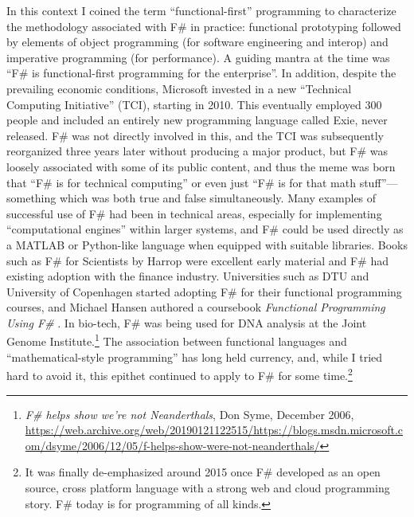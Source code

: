 \documentclass[acmsmall]{acmart}\settopmatter{}
\begin{document}
In this context I coined the term “functional-first” programming to characterize the methodology associated with F\# in practice: functional prototyping
followed by elements of object programming (for software engineering and interop) and imperative programming (for performance). A guiding mantra
at the time was “F\# is functional-first programming for the enterprise”.  In addition, despite the prevailing economic conditions, Microsoft invested in a
new “Technical Computing Initiative” (TCI), starting in 2010. This eventually employed 300 people and included an entirely new programming language
called Exie, never released.  F\# was not directly involved in this, and the TCI was subsequently reorganized three years later without producing a major
product, but F\# was loosely associated with some of its public content, and thus the meme was born that “F\# is for technical computing” or even
just “F\# is for that math stuff”---something which was both true and false simultaneously. Many examples of successful use of F\# had been in
technical areas, especially for implementing “computational engines” within larger systems, and F\# could be used directly as a MATLAB or Python-like
language when equipped with suitable libraries.  Books such as F\# for Scientists by Harrop were excellent early material and F\# had existing adoption
with the finance industry. Universities such as DTU and University of Copenhagen started adopting F\# for their functional programming courses,
and Michael Hansen authored a coursebook \textit{Functional Programming Using F\#} \citep{Hansen2011}.
In bio-tech, F\# was being used for DNA analysis at the Joint Genome
Institute.\footnote{\textit{F\# helps show we’re not Neanderthals}, Don Syme, December 2006, \url{https://web.archive.org/web/20190121122515/https://blogs.msdn.microsoft.com/dsyme/2006/12/05/f-helps-show-were-not-neanderthals/}}  The association between functional languages and
“mathematical-style programming” has long held currency, and, while I tried hard to avoid it, this epithet continued to
apply to F\# for some time.\footnote{It was finally de-emphasized around 2015 once F\# developed as an open source, cross
platform language with a strong web and cloud programming story. F\# today is for programming of all kinds.}

\label{page:fsharp-succinct}
\end{document}
